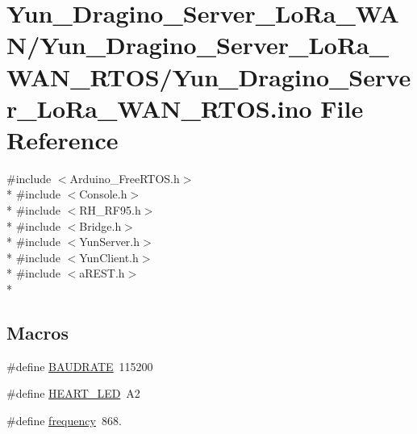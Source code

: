 \hypertarget{Yun__Dragino__Server__LoRa__WAN__RTOS_8ino}{\section{Yun\-\_\-\-Dragino\-\_\-\-Server\-\_\-\-Lo\-Ra\-\_\-\-W\-A\-N/\-Yun\-\_\-\-Dragino\-\_\-\-Server\-\_\-\-Lo\-Ra\-\_\-\-W\-A\-N\-\_\-\-R\-T\-O\-S/\-Yun\-\_\-\-Dragino\-\_\-\-Server\-\_\-\-Lo\-Ra\-\_\-\-W\-A\-N\-\_\-\-R\-T\-O\-S.ino File Reference}
\label{Yun__Dragino__Server__LoRa__WAN__RTOS_8ino}
}
{\ttfamily \#include $<$Arduino\-\_\-\-Free\-R\-T\-O\-S.\-h$>$}\\*
{\ttfamily \#include $<$Console.\-h$>$}\\*
{\ttfamily \#include $<$R\-H\-\_\-\-R\-F95.\-h$>$}\\*
{\ttfamily \#include $<$Bridge.\-h$>$}\\*
{\ttfamily \#include $<$Yun\-Server.\-h$>$}\\*
{\ttfamily \#include $<$Yun\-Client.\-h$>$}\\*
{\ttfamily \#include $<$a\-R\-E\-S\-T.\-h$>$}\\*
\subsection*{Macros}
\begin{DoxyCompactItemize}
\item 
\#define \hyperlink{Yun__Dragino__Server__LoRa__WAN__RTOS_8ino_a734bbab06e1a9fd2e5522db0221ff6e3}{B\-A\-U\-D\-R\-A\-T\-E}~115200
\item 
\#define \hyperlink{Yun__Dragino__Server__LoRa__WAN__RTOS_8ino_ab5e96fdebe625793e8ec86ab6b5d9043}{H\-E\-A\-R\-T\-\_\-\-L\-E\-D}~A2
\item 
\#define \hyperlink{Yun__Dragino__Server__LoRa__WAN__RTOS_8ino_a6556f9ceceffdd10267822cefcb49ea5}{frequency}~868.
\end{DoxyCompactItemize}
